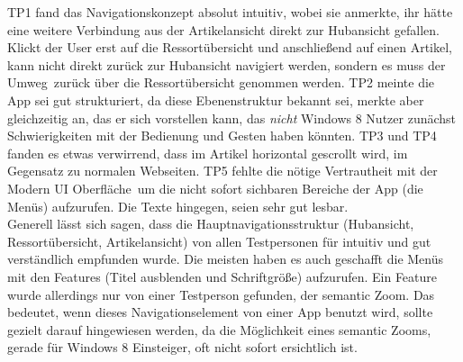 \documentclass[12pt,a4paper,bibtotoc,abstracton]{scrartcl}
\begin{document}
TP1 fand das Navigationskonzept \glqq absolut intuitiv\grqq, wobei sie anmerkte, ihr hätte eine weitere Verbindung aus der Artikelansicht direkt zur Hubansicht gefallen. Klickt der User erst auf die Ressortübersicht und anschließend auf einen Artikel, kann nicht direkt zurück zur Hubansicht navigiert werden, sondern es muss der \glqq Umweg\grqq\ zurück über die Ressortübersicht genommen werden. TP2 meinte die App sei gut strukturiert, da diese Ebenenstruktur bekannt sei, merkte aber gleichzeitig an, das er sich vorstellen kann, das \textit{nicht} Windows 8 Nutzer zunächst Schwierigkeiten mit der Bedienung und Gesten haben könnten. TP3 und TP4 fanden es etwas verwirrend, dass im Artikel horizontal gescrollt wird, im Gegensatz zu normalen Webseiten. TP5 \glqq fehlte die nötige Vertrautheit mit der Modern UI Oberfläche\grqq\ um die nicht sofort sichbaren Bereiche der App (die Menüs) aufzurufen. Die Texte hingegen, seien sehr gut lesbar.\\

Generell lässt sich sagen, dass die Hauptnavigationsstruktur (Hubansicht, Ressortübersicht, Artikelansicht) von allen Testpersonen für intuitiv und gut verständlich empfunden wurde. Die meisten haben es auch geschafft die Menüs mit den Features (Titel ausblenden und Schriftgröße) aufzurufen. Ein Feature wurde allerdings nur von einer Testperson gefunden, der semantic Zoom. Das bedeutet, wenn dieses Navigationselement von einer App benutzt wird, sollte gezielt darauf hingewiesen werden, da die Möglichkeit eines semantic Zooms, gerade für Windows 8 Einsteiger, oft nicht sofort ersichtlich ist.
\end{document}
